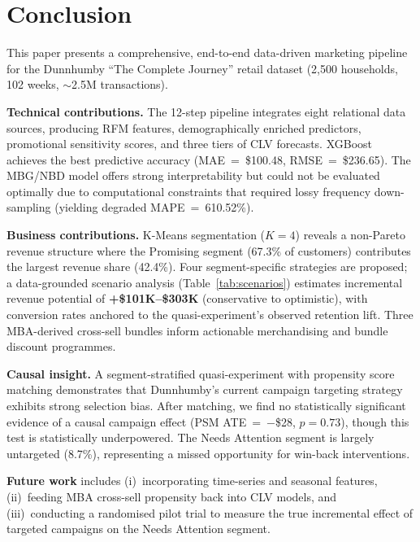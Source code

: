 \documentclass[conference]{IEEEtran}
\begin{document}
\section{Conclusion}
\label{sec:conclusion}

This paper presents a comprehensive, end-to-end data-driven
marketing pipeline for the Dunnhumby ``The Complete Journey''
retail dataset (2{,}500 households, 102 weeks,
${\sim}$2.5M transactions).

\textbf{Technical contributions.}
The 12-step pipeline integrates eight relational data sources,
producing RFM features, demographically enriched predictors,
promotional sensitivity scores, and three tiers of CLV
forecasts. XGBoost achieves the best predictive accuracy
(MAE~=~\$100.48, RMSE~=~\$236.65). The MBG/NBD model offers
strong interpretability but could not be evaluated optimally due to computational constraints that required lossy frequency down-sampling (yielding degraded MAPE~=~610.52\%).

\textbf{Business contributions.}
K-Means segmentation ($K = 4$) reveals a non-Pareto revenue
structure where the Promising segment (67.3\% of customers)
contributes the largest revenue share (42.4\%). Four
segment-specific strategies are proposed; a data-grounded
scenario analysis (Table~\ref{tab:scenarios}) estimates incremental
revenue potential of \textbf{+\$101K--\$303K} (conservative to
optimistic), with conversion rates anchored to the quasi-experiment's
observed retention lift. Three MBA-derived cross-sell
bundles inform actionable merchandising and bundle discount
programmes.

\textbf{Causal insight.}
A segment-stratified quasi-experiment with propensity score
matching demonstrates that Dunnhumby's current campaign
targeting strategy exhibits strong selection bias. After matching,
we find no statistically significant evidence of a causal campaign effect (PSM
ATE~=~$-$\$28, $p = 0.73$), though this test is statistically underpowered.
The Needs Attention segment is
largely untargeted (8.7\%), representing a missed opportunity
for win-back interventions.

\textbf{Future work} includes (i)~incorporating time-series
and seasonal features, (ii)~feeding MBA cross-sell propensity
back into CLV models, and (iii)~conducting a randomised pilot
trial to measure the true incremental effect of targeted
campaigns on the Needs Attention segment.
\end{document}
